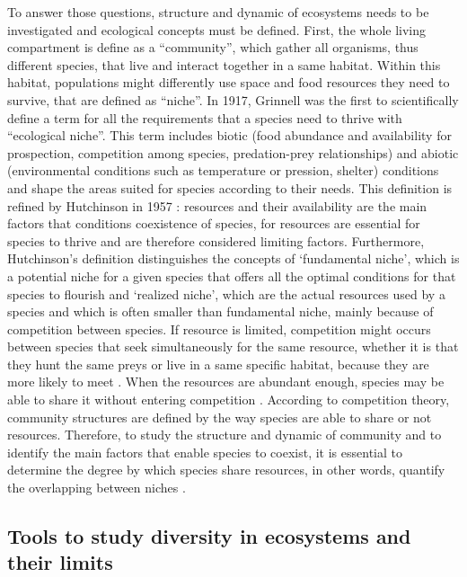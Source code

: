 To answer those questions, structure and dynamic of ecosystems needs to be investigated and ecological concepts must be defined. First, the whole living compartment is define as a “community”, which gather all organisms, thus different species, that live and interact together in a same habitat. Within this habitat, populations might differently use space and food resources they need to survive, that are defined as “niche”. In 1917, Grinnell was the first to scientifically define a term for all the requirements that a species need to thrive with “ecological niche”. This term includes biotic (food abundance and availability for prospection, competition among species, predation-prey relationships) and abiotic (environmental conditions such as temperature or pression, shelter) conditions and shape the areas suited for species according to their needs. This definition is refined by Hutchinson in 1957 : resources and their availability are the main factors that conditions coexistence of species, for resources are essential for species to thrive and are therefore considered limiting factors. Furthermore, Hutchinson’s definition distinguishes the concepts of ‘fundamental niche’, which is a potential niche for a given species that offers all the optimal conditions for that species to flourish and ‘realized niche’, which are the actual resources used by a species and which is often smaller than fundamental niche, mainly because of competition between species. If resource is limited, competition might occurs between species that seek simultaneously for the same resource, whether it is that they hunt the same preys or live in a same specific habitat, because they are more likely to meet \citep{blondel1979}. When the resources are abundant enough, species may be able to share it without entering competition \citep{nagelkerke2018}. According to competition theory, community structures are defined by the way species are able to share or not resources. Therefore, to study the structure and dynamic of community and to identify the main factors that enable species to coexist, it is essential to determine the degree by which species share resources, in other words, quantify the overlapping between niches \citep{geange2011}.


\subsection{Tools to study diversity in ecosystems and their limits}


